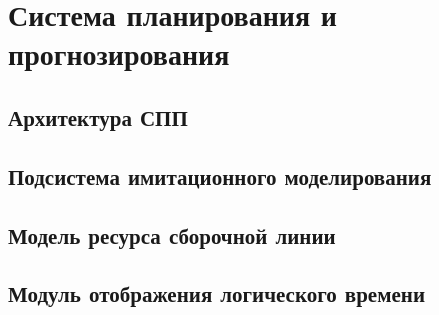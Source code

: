 \chapter{Система планирования и прогнозирования}
\section{Архитектура СПП}
\section{Подсистема имитационного моделирования}
\section{Модель ресурса сборочной линии}
\section{Модуль отображения логического времени}

